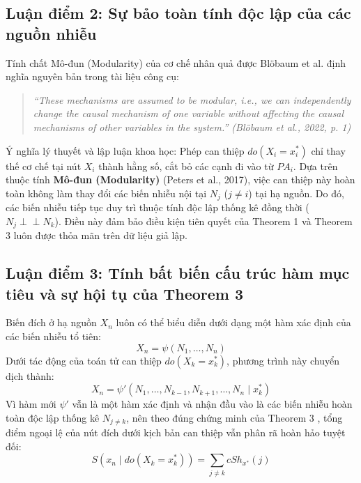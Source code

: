 \documentclass[11pt,a4paper]{article}
\begin{document}
\subsection{Luận điểm 2: Sự bảo toàn tính độc lập của các nguồn nhiễu}

Tính chất Mô-đun (Modularity) của cơ chế nhân quả được Blöbaum et al. định nghĩa nguyên bản trong tài liệu công cụ:
\begin{quote}
\itshape
``These mechanisms are assumed to be modular, i.e., we can independently change the causal mechanism of one variable without affecting the causal mechanisms of other variables in the system.'' (Blöbaum et al., 2022, p. 1)
\end{quote}

Ý nghĩa lý thuyết và lập luận khoa học:
Phép can thiệp $do(X_i = x_i^*)$ chỉ thay thế cơ chế tại nút $X_i$ thành hằng số, cắt bỏ các cạnh đi vào từ $PA_i$. Dựa trên thuộc tính \textbf{Mô-đun (Modularity)} (Peters et al., 2017), việc can thiệp này hoàn toàn không làm thay đổi các biến nhiễu nội tại $N_j$ ($j \neq i$) tại hạ nguồn. Do đó, các biến nhiễu tiếp tục duy trì thuộc tính độc lập thống kê đồng thời ($N_j \perp \!\!\! \perp N_k$). Điều này đảm bảo điều kiện tiên quyết của Theorem 1 và Theorem 3 luôn được thỏa mãn trên dữ liệu giả lập.

\subsection{Luận điểm 3: Tính bất biến cấu trúc hàm mục tiêu và sự hội tụ của Theorem 3}
\label{sec:invariance-forward}
Biến đích ở hạ nguồn $X_n$ luôn có thể biểu diễn dưới dạng một hàm xác định của các biến nhiễu tổ tiên:
\begin{equation}
X_n = \psi(N_1, \dots, N_n)
\end{equation}
Dưới tác động của toán tử can thiệp $do(X_k = x_k^*)$, phương trình này chuyển dịch thành:
\begin{equation}
X_n = \psi'(N_1, \dots, N_{k-1}, N_{k+1}, \dots, N_n \mid x_k^*)
\end{equation}
Vì hàm mới $\psi'$ vẫn là một hàm xác định và nhận đầu vào là các biến nhiễu hoàn toàn độc lập thống kê $N_{j \neq k}$, nên theo đúng chứng minh của Theorem 3 \cite{janzing2019rootcause}, tổng điểm ngoại lệ của nút đích dưới kịch bản can thiệp vẫn phân rã hoàn hảo tuyệt đối:
\begin{equation}
S(x_n \mid do(X_k = x_k^*)) = \sum_{j \neq k} cSh_{x^*}(j)
\end{equation}
\end{document}
